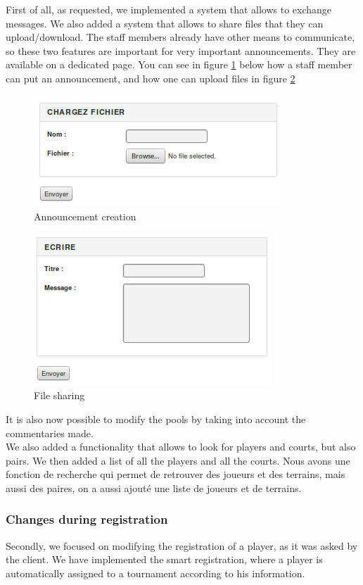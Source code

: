 \documentclass[a4paper, 12pt]{article}
\begin{document}
First of all, as requested, we implemented a system that allows to exchange messages. We also added a system that allows to share files that they can upload/download. The staff members already have other means to communicate, so these two features are important for very important announcements. They are available on a dedicated page. You can see in figure \ref{annonce} below how a staff member can put an announcement, and how one can upload files in figure \ref{file} \\
\begin{figure}[h]
  \caption{\label{annonce} Announcement creation}
  \includegraphics[scale=0.7]{annonce.png}
\end{figure}
\begin{figure}[h]
  \caption{\label{file} File sharing}
  \includegraphics[scale=0.7]{fichier.png}
\end{figure}


It is also now possible to modify the pools by taking into account the commentaries made.\\

We also added a functionality that allows to look for players and courts, but also pairs. We then added a list of all the players and all the courts.
Nous avons une fonction de recherche qui permet de retrouver des joueurs et des terrains, mais aussi des paires, on a aussi ajouté une liste de joueurs et de terrains. 

\subsubsection*{Changes during registration}
Secondly, we focused on modifying the registration of a player, as it was asked by the client. We have implemented the smart registration, where a player is automatically assigned to a tournament according to his information.\\
\end{document}
